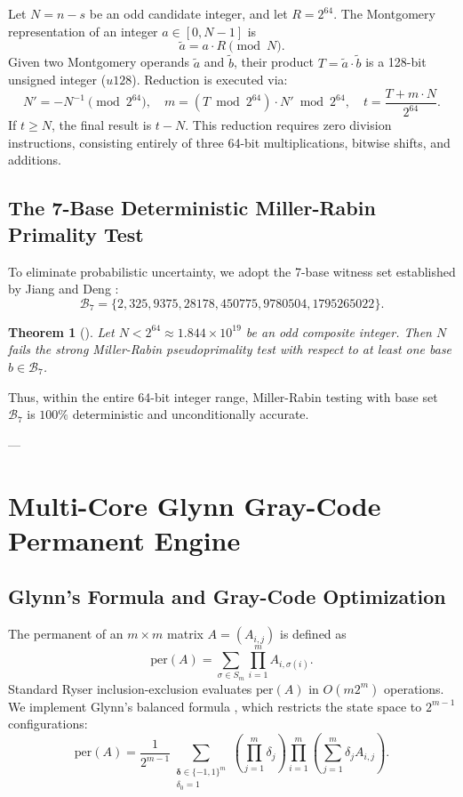 \documentclass[11pt,a4paper]{article}
\newtheorem{theorem}{Theorem}[section]
\theoremstyle{definition}
\theoremstyle{remark}
\begin{document}
Let $N = n - s$ be an odd candidate integer, and let $R = 2^{64}$. The Montgomery representation of an integer $a \in [0, N-1]$ is
\begin{equation}
\widetilde{a} = a \cdot R \pmod N.
\end{equation}
Given two Montgomery operands $\widetilde{a}$ and $\widetilde{b}$, their product $T = \widetilde{a} \cdot \widetilde{b}$ is a 128-bit unsigned integer ($u128$). Reduction is executed via:
\begin{equation}
N' = -N^{-1} \pmod{2^{64}}, \quad m = (T \bmod 2^{64}) \cdot N' \bmod 2^{64}, \quad t = \frac{T + m \cdot N}{2^{64}}.
\end{equation}
If $t \ge N$, the final result is $t - N$. This reduction requires zero division instructions, consisting entirely of three 64-bit multiplications, bitwise shifts, and additions.

\subsection{The 7-Base Deterministic Miller-Rabin Primality Test}
To eliminate probabilistic uncertainty, we adopt the 7-base witness set established by Jiang and Deng \cite{jiang2014}:
\begin{equation}
\mathcal{B}_7 = \{2, 325, 9375, 28178, 450775, 9780504, 1795265022\}.
\end{equation}
\begin{theorem}[\cite{jiang2014}]
Let $N < 2^{64} \approx 1.844 \times 10^{19}$ be an odd composite integer. Then $N$ fails the strong Miller-Rabin pseudoprimality test with respect to at least one base $b \in \mathcal{B}_7$.
\end{theorem}
Thus, within the entire 64-bit integer range, Miller-Rabin testing with base set $\mathcal{B}_7$ is $100\%$ deterministic and unconditionally accurate.

---

\section{Multi-Core Glynn Gray-Code Permanent Engine}

\subsection{Glynn's Formula and Gray-Code Optimization}
The permanent of an $m \times m$ matrix $A = (A_{i,j})$ is defined as
\begin{equation}
\mathrm{per}(A) = \sum_{\sigma \in S_m} \prod_{i=1}^m A_{i, \sigma(i)}.
\end{equation}
Standard Ryser inclusion-exclusion evaluates $\mathrm{per}(A)$ in $O(m 2^m)$ operations. We implement Glynn's balanced formula \cite{glynn2010}, which restricts the state space to $2^{m-1}$ configurations:
\begin{equation}
\mathrm{per}(A) = \frac{1}{2^{m-1}} \sum_{\substack{\boldsymbol{\delta} \in \{-1, 1\}^m \\ \delta_0 = 1}} \left(\prod_{j=1}^m \delta_j\right) \prod_{i=1}^m \left(\sum_{j=1}^m \delta_j A_{i,j}\right).
\end{equation}
\end{document}

